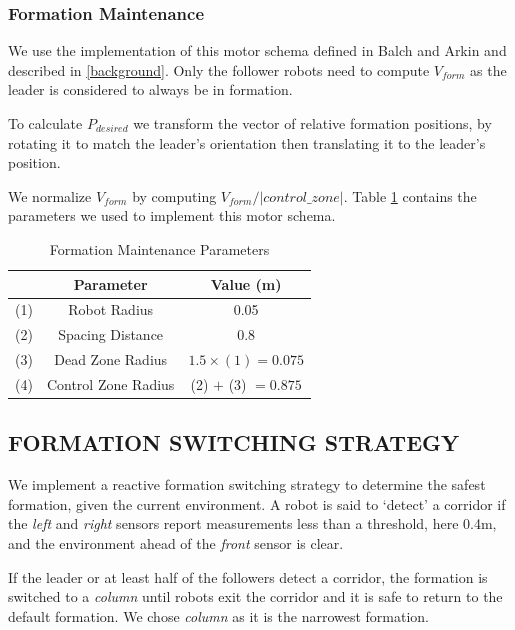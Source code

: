 \documentclass[letterpaper, 10 pt, conference]{ieeeconf}  %
\begin{document}
\subsubsection*{Formation Maintenance}

We use the implementation of this motor schema defined in Balch and Arkin and described in \ref{background}. Only the follower robots need to compute $V_{form}$ as the leader is considered to always be in formation.

To calculate $P_{desired}$ we transform the vector of relative formation positions, by rotating it to match the leader's orientation then translating it to the leader's position.

We normalize $V_{form}$ by computing $V_{form}/|control\_zone|$. Table \ref{table_formation} contains the parameters we used to implement this motor schema.

\begin{table}[h]
\begin{center}
\begin{tabular}{|c|c|c|}
\hline
& Parameter & Value (m) \\
\hline
(1) & Robot Radius             & 0.05 \\
(2) & Spacing Distance        & 0.8 \\
(3) & Dead Zone Radius      & $1.5 \times (1) = 0.075$ \\
(4) & Control Zone Radius    & (2) $+$ (3) $=0.875$ \\
\hline
\end{tabular}
\end{center}
\caption{Formation Maintenance Parameters}
\label{table_formation}
\end{table}

\subsection{FORMATION SWITCHING STRATEGY}

We implement a reactive formation switching strategy to determine the safest formation, given the current environment. A robot is said to `detect' a corridor if the \textit{left} and \textit{right} sensors report measurements less than a threshold, here 0.4m, and the environment ahead of the \textit{front} sensor is clear.

If the leader or at least half of the followers detect a corridor, the formation is switched to a \textit{column} until robots exit the corridor and it is safe to return to the default formation. We chose \textit{column} as it is the narrowest formation.
\end{document}
